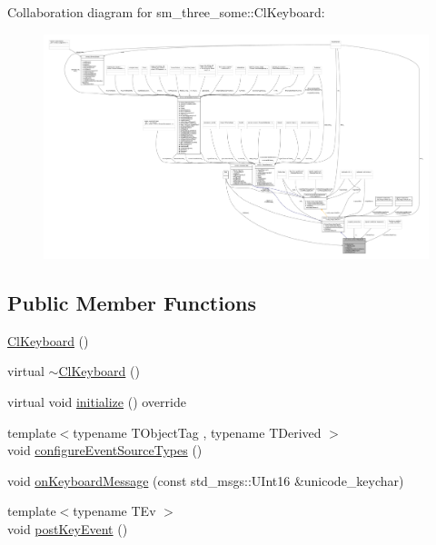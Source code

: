 Collaboration diagram for sm\+\_\+three\+\_\+some\+:\+:Cl\+Keyboard\+:
\nopagebreak
\begin{figure}[H]
\begin{center}
\leavevmode
\includegraphics[width=350pt]{classsm__three__some_1_1ClKeyboard__coll__graph}
\end{center}
\end{figure}
\subsection*{Public Member Functions}
\begin{DoxyCompactItemize}
\item 
\hyperlink{classsm__three__some_1_1ClKeyboard_adf56f7d1cba8294c12cc711c1916496d}{Cl\+Keyboard} ()
\item 
virtual \hyperlink{classsm__three__some_1_1ClKeyboard_a08df3fe2752b6eee73899e511d7d888a}{$\sim$\+Cl\+Keyboard} ()
\item 
virtual void \hyperlink{classsm__three__some_1_1ClKeyboard_adbc06c9dc3a4a5b266ff70a4300dcdeb}{initialize} () override
\item 
{\footnotesize template$<$typename T\+Object\+Tag , typename T\+Derived $>$ }\\void \hyperlink{classsm__three__some_1_1ClKeyboard_a01fc3b9cb7b60b9e764dfa8debbd17ab}{configure\+Event\+Source\+Types} ()
\item 
void \hyperlink{classsm__three__some_1_1ClKeyboard_ad6f5619d4c4875a6d0dc8262ab49e10f}{on\+Keyboard\+Message} (const std\+\_\+msgs\+::\+U\+Int16 \&unicode\+\_\+keychar)
\item 
{\footnotesize template$<$typename T\+Ev $>$ }\\void \hyperlink{classsm__three__some_1_1ClKeyboard_a7e632c803df38eba991432752bcf7116}{post\+Key\+Event} ()
\end{DoxyCompactItemize}
